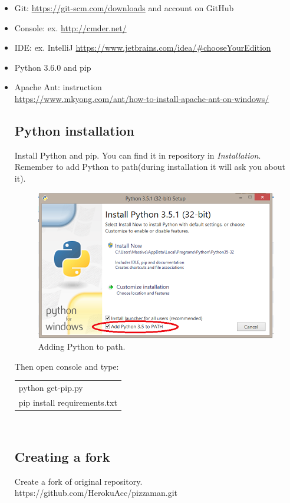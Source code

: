 \documentclass[12pt,a4paper]{article}
\begin{document}
\begin{itemize}
\item Git: \url{https://git-scm.com/downloads} and account on GitHub
\item Console: ex. \url{http://cmder.net/}
\item IDE: ex. IntelliJ \url{https://www.jetbrains.com/idea/#chooseYourEdition}
\item Python 3.6.0 and pip
\item Apache Ant: instruction\\ \url{https://www.mkyong.com/ant/how-to-install-apache-ant-on-windows/} 

\subsection{Python installation}
Install Python and pip. You can find it in repository in \textit{Installation}.
Remember to add Python to path(during installation it will ask you about it).\\

\begin{figure}[H]
\centering
\includegraphics[width = 1 \textwidth]{images/python.PNG}
\caption{Adding Python to path.}
\label{fig:path}
\end{figure}

Then open console and type:

\begin{tabular}{|l|}
	\hline
	python get-pip.py\\
	pip install requirements.txt\\
	\hline
\end{tabular}\\

\subsection{Creating a fork}
Create a fork of original repository. \\
https://github.com/HerokuAcc/pizzaman.git\\


\end{itemize}
\end{document}
